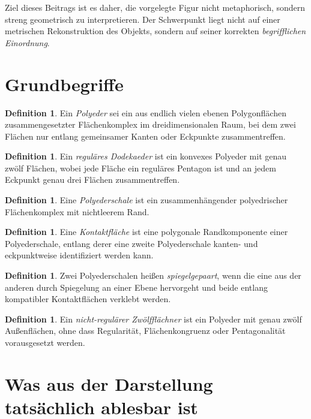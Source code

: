 \documentclass[11pt]{article}
\theoremstyle{plain}
\theoremstyle{definition}
\newtheorem{definition}[satz]{Definition}
\theoremstyle{remark}
\begin{document}
	Ziel dieses Beitrags ist es daher, die vorgelegte Figur nicht metaphorisch, sondern streng geometrisch zu interpretieren. Der Schwerpunkt liegt nicht auf einer metrischen Rekonstruktion des Objekts, sondern auf seiner korrekten \emph{begrifflichen Einordnung}.
	
	\section{Grundbegriffe}
	
	\begin{definition}
		Ein \emph{Polyeder} sei ein aus endlich vielen ebenen Polygonflächen zusammengesetzter Flächenkomplex im dreidimensionalen Raum, bei dem zwei Flächen nur entlang gemeinsamer Kanten oder Eckpunkte zusammentreffen.
	\end{definition}
	
	\begin{definition}
		Ein \emph{reguläres Dodekaeder} ist ein konvexes Polyeder mit genau zwölf Flächen, wobei jede Fläche ein reguläres Pentagon ist und an jedem Eckpunkt genau drei Flächen zusammentreffen.
	\end{definition}
	
	\begin{definition}
		Eine \emph{Polyederschale} ist ein zusammenhängender polyedrischer Flächenkomplex mit nichtleerem Rand.
	\end{definition}
	
	\begin{definition}
		Eine \emph{Kontaktfläche} ist eine polygonale Randkomponente einer Polyederschale, entlang derer eine zweite Polyederschale kanten- und eckpunktweise identifiziert werden kann.
	\end{definition}
	
	\begin{definition}
		Zwei Polyederschalen heißen \emph{spiegelgepaart}, wenn die eine aus der anderen durch Spiegelung an einer Ebene hervorgeht und beide entlang kompatibler Kontaktflächen verklebt werden.
	\end{definition}
	
	\begin{definition}
		Ein \emph{nicht-regulärer Zwölfflächner} ist ein Polyeder mit genau zwölf Außenflächen, ohne dass Regularität, Flächenkongruenz oder Pentagonalität vorausgesetzt werden.
	\end{definition}
	
	\section{Was aus der Darstellung tatsächlich ablesbar ist}
	
\end{document}
